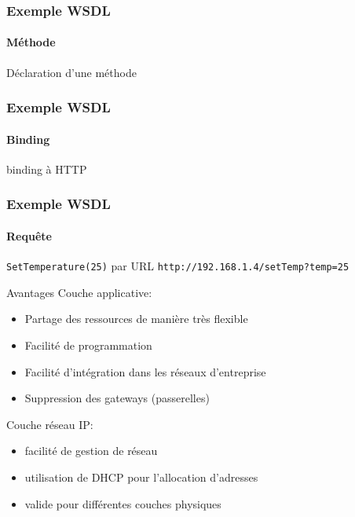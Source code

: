 \begin{frame}
\frametitle{Exemple WSDL}
\framesubtitle{Méthode}
\begin{exampleblock}{Déclaration d'une méthode}

\end{exampleblock}
\end{frame}

\begin{frame}
\frametitle{Exemple WSDL}
\framesubtitle{Binding}
\begin{exampleblock}{binding à HTTP}

\end{exampleblock}
\end{frame}

\begin{frame}
\frametitle{Exemple WSDL}
\framesubtitle{Requête}
\begin{exampleblock}{\texttt{SetTemperature(25)} par URL}
\texttt{http://192.168.1.4/setTemp?temp=25}
\end{exampleblock}
\end{frame}

\begin{frame}{Avantages}
Couche applicative:
\begin{itemize}
\item Partage des ressources de manière très flexible %
\item Facilité de programmation %
\item Facilité d’intégration dans les réseaux d’entreprise %
\item Suppression des gateways (passerelles)%
\end{itemize}
\vspace{5mm}
Couche réseau IP:
\begin{itemize}
\item facilité de gestion de réseau
\item utilisation de DHCP pour l’allocation d’adresses
\item valide pour différentes couches physiques
\end{itemize}
\end{frame}

